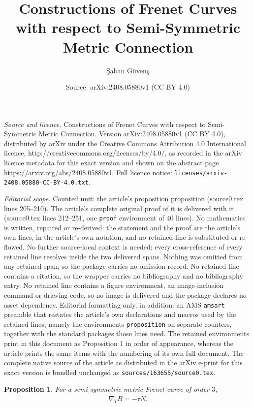 \documentclass[10pt,a4paper]{amsart}
\title{Constructions of Frenet Curves with respect to Semi-Symmetric Metric Connection}
\author{\c{S}aban G\"uven\c{c}}
\date{Source: arXiv:2408.05880v1 (CC BY 4.0)}
\newtheorem{proposition}{Proposition}
\begin{document}
\maketitle

\noindent\emph{Source and licence.} Constructions of Frenet Curves with respect to Semi-Symmetric Metric Connection. Version arXiv:2408.05880v1 (CC BY 4.0), distributed by arXiv under the Creative Commons Attribution 4.0 International licence, http://creativecommons.org/licenses/by/4.0/, as recorded in the arXiv licence metadata for this exact version and shown on the abstract page https://arxiv.org/abs/2408.05880v1. Full licence notice: \texttt{licenses/arxiv-2408.05880-CC-BY-4.0.txt}.\par\smallskip

\noindent\textit{Editorial scope.} Counted unit: the article's proposition proposition (source0.tex lines 205--210). The article's complete original proof of it is delivered with it (source0.tex lines 212--251, one \texttt{proof} environment of 40 lines). No mathematics is written, repaired or re-derived: the statement and the proof are the article's own lines, in the article's own notation, and no retained line is substituted or re-flowed.  No further source-local context is needed: every cross-reference of every retained line resolves inside the two delivered spans.  Nothing was omitted from any retained span, so the package carries no omission record.  No retained line contains a citation, so the wrapper carries no bibliography and no bibliography entry.  No retained line contains a figure environment, an image-inclusion command or drawing code, so no image is delivered and the package declares no asset dependency.  Editorial formatting only, in addition: an AMS \texttt{amsart} preamble that restates the article's own declarations and macros used by the retained lines, namely the environments \texttt{proposition} on separate counters, together with the standard packages those lines need.  The retained environments print in this document as Proposition 1 in order of appearance, whereas the article prints the same items with the numbering of its own full document.  The complete native source of the article as distributed in the arXiv e-print for this exact version is bundled unchanged as \texttt{sources/163655/source0.tex}.
\begin{proposition}
For a semi-symmetric metric Frenet curve of order $3$, 
\begin{equation*}
\widetilde{\nabla }_{T}B=-\widetilde{\tau }N.
\end{equation*}
\end{proposition}
\end{document}
